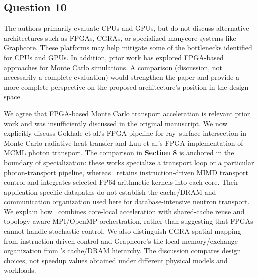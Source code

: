 \subsection{Question 10}
\begin{reviewcomment}
The authors primarily evaluate CPUs and GPUs, but do not discuss alternative architectures such as FPGAs, CGRAs, or specialized manycore systems like Graphcore. These platforms may help mitigate some of the bottlenecks identified for CPUs and GPUs. In addition, prior work has explored FPGA-based approaches for Monte Carlo simulations. A comparison (discussion, not necessarily a complete evaluation) would strengthen the paper and provide a more complete perspective on the proposed architecture's position in the design space.
\end{reviewcomment}

We agree that FPGA-based Monte Carlo transport acceleration is relevant prior work and was insufficiently discussed in the original manuscript. We now explicitly discuss Gokhale et al.'s FPGA pipeline for ray--surface intersection in Monte Carlo radiative heat transfer and Luu et al.'s FPGA implementation of MCML photon transport. The comparison in \textbf{Section 8} is anchored in the boundary of specialization: these works specialize a transport loop or a particular photon-transport pipeline, whereas \name\ retains instruction-driven MIMD transport control and integrates selected FP64 arithmetic kernels into each core. Their application-specific datapaths do not establish the cache/DRAM and communication organization used here for database-intensive neutron transport. We explain how \name\ combines core-local acceleration with shared-cache reuse and topology-aware MPI/OpenMP orchestration, rather than suggesting that FPGAs cannot handle stochastic control. We also distinguish CGRA spatial mapping from instruction-driven control and Graphcore's tile-local memory/exchange organization from \name's cache/DRAM hierarchy. The discussion compares design choices, not speedup values obtained under different physical models and workloads.


